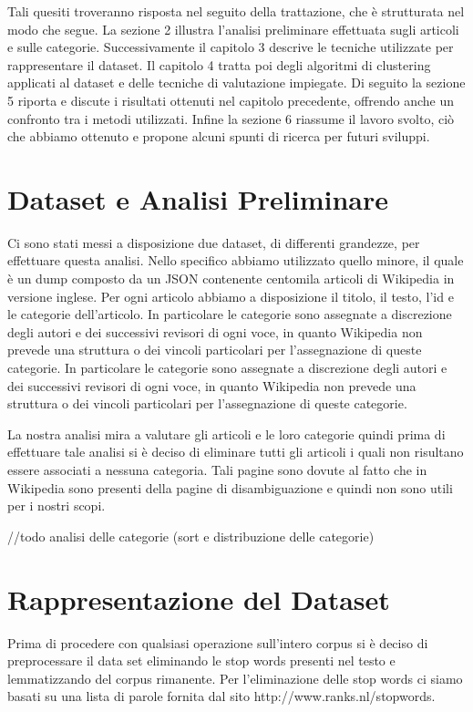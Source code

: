 \documentclass[
12pt, %
a4paper, %
oneside, %
headinclude,footinclude, %
BCOR5mm, %
]{scrartcl}
\begin{document}
Tali quesiti troveranno risposta nel seguito della trattazione, che è strutturata nel modo che segue.
La sezione 2 illustra l'analisi preliminare effettuata sugli articoli e sulle categorie.
Successivamente il capitolo 3 descrive le tecniche utilizzate per rappresentare il dataset.
Il capitolo 4 tratta poi degli algoritmi di clustering applicati al dataset e delle tecniche di valutazione impiegate.
Di seguito la sezione 5 riporta e discute i risultati ottenuti nel capitolo precedente, offrendo anche un confronto tra i metodi utilizzati.
Infine la sezione 6 riassume il lavoro svolto, ciò che abbiamo ottenuto e propone alcuni spunti di ricerca per futuri sviluppi.


\section{Dataset e Analisi Preliminare}

Ci sono stati messi a disposizione due dataset, di differenti grandezze, per effettuare questa analisi.
Nello specifico abbiamo utilizzato quello minore, il quale è un dump composto da un JSON contenente centomila articoli di Wikipedia in versione inglese.
Per ogni articolo abbiamo a disposizione il titolo, il testo, l'id e le categorie dell'articolo.
In particolare le categorie sono assegnate a discrezione degli autori e dei successivi revisori di ogni voce, in quanto Wikipedia non prevede una struttura o dei vincoli particolari per l'assegnazione di queste categorie.
In particolare le categorie sono assegnate a discrezione degli autori e dei successivi revisori di ogni voce, in quanto Wikipedia non prevede una struttura o dei vincoli particolari per l'assegnazione di queste categorie.

La nostra analisi mira a valutare gli articoli e le loro categorie quindi prima di effettuare
tale analisi si è deciso di eliminare tutti gli articoli i quali non risultano essere associati a
nessuna categoria. Tali pagine sono dovute al fatto che in Wikipedia sono presenti della pagine di
disambiguazione e quindi non sono utili per i nostri scopi.

//todo analisi delle categorie (sort e distribuzione delle categorie)

\section{Rappresentazione del Dataset}

	Prima di procedere con qualsiasi operazione sull'intero corpus si è deciso di preprocessare il data set
    eliminando le stop words presenti nel testo e lemmatizzando del corpus rimanente. Per l'eliminazione delle
    stop words ci siamo basati su una lista di parole fornita dal sito http://www.ranks.nl/stopwords.
\end{document}
